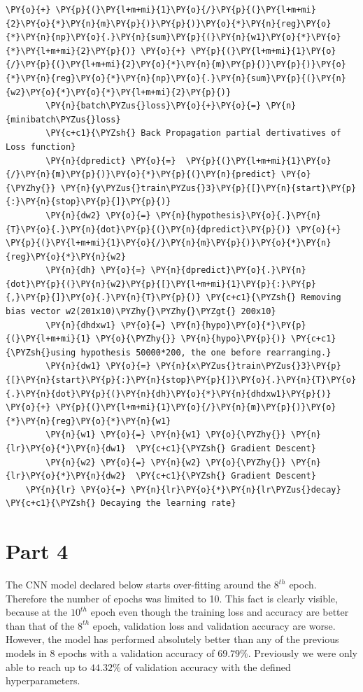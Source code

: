 \documentclass[a4paper,11pt]{article}%
\begin{document}
\begin{tcolorbox}[breakable, size=fbox, boxrule=1pt, pad at break*=1mm,colback=cellbackground, colframe=cellborder]
\begin{Verbatim}[commandchars=\\\{\}]
             \PY{o}{+} \PY{p}{(}\PY{l+m+mi}{1}\PY{o}{/}\PY{p}{(}\PY{l+m+mi}{2}\PY{o}{*}\PY{n}{m}\PY{p}{)}\PY{p}{)}\PY{o}{*}\PY{n}{reg}\PY{o}{*}\PY{n}{np}\PY{o}{.}\PY{n}{sum}\PY{p}{(}\PY{n}{w1}\PY{o}{*}\PY{o}{*}\PY{l+m+mi}{2}\PY{p}{)} \PY{o}{+} \PY{p}{(}\PY{l+m+mi}{1}\PY{o}{/}\PY{p}{(}\PY{l+m+mi}{2}\PY{o}{*}\PY{n}{m}\PY{p}{)}\PY{p}{)}\PY{o}{*}\PY{n}{reg}\PY{o}{*}\PY{n}{np}\PY{o}{.}\PY{n}{sum}\PY{p}{(}\PY{n}{w2}\PY{o}{*}\PY{o}{*}\PY{l+m+mi}{2}\PY{p}{)}
        \PY{n}{batch\PYZus{}loss}\PY{o}{+}\PY{o}{=} \PY{n}{minibatch\PYZus{}loss}
        \PY{c+c1}{\PYZsh{} Back Propagation partial dertivatives of Loss function}
        \PY{n}{dpredict} \PY{o}{=}  \PY{p}{(}\PY{l+m+mi}{1}\PY{o}{/}\PY{n}{m}\PY{p}{)}\PY{o}{*}\PY{p}{(}\PY{n}{predict} \PY{o}{\PYZhy{}} \PY{n}{y\PYZus{}train\PYZus{}3}\PY{p}{[}\PY{n}{start}\PY{p}{:}\PY{n}{stop}\PY{p}{]}\PY{p}{)}
        \PY{n}{dw2} \PY{o}{=} \PY{n}{hypothesis}\PY{o}{.}\PY{n}{T}\PY{o}{.}\PY{n}{dot}\PY{p}{(}\PY{n}{dpredict}\PY{p}{)} \PY{o}{+} \PY{p}{(}\PY{l+m+mi}{1}\PY{o}{/}\PY{n}{m}\PY{p}{)}\PY{o}{*}\PY{n}{reg}\PY{o}{*}\PY{n}{w2}
        \PY{n}{dh} \PY{o}{=} \PY{n}{dpredict}\PY{o}{.}\PY{n}{dot}\PY{p}{(}\PY{n}{w2}\PY{p}{[}\PY{l+m+mi}{1}\PY{p}{:}\PY{p}{,}\PY{p}{]}\PY{o}{.}\PY{n}{T}\PY{p}{)} \PY{c+c1}{\PYZsh{} Removing bias vector w2(201x10)\PYZhy{}\PYZhy{}\PYZgt{} 200x10}
        \PY{n}{dhdxw1} \PY{o}{=} \PY{n}{hypo}\PY{o}{*}\PY{p}{(}\PY{l+m+mi}{1} \PY{o}{\PYZhy{}} \PY{n}{hypo}\PY{p}{)} \PY{c+c1}{\PYZsh{}using hypothesis 50000*200, the one before rearranging.}
        \PY{n}{dw1} \PY{o}{=} \PY{n}{x\PYZus{}train\PYZus{}3}\PY{p}{[}\PY{n}{start}\PY{p}{:}\PY{n}{stop}\PY{p}{]}\PY{o}{.}\PY{n}{T}\PY{o}{.}\PY{n}{dot}\PY{p}{(}\PY{n}{dh}\PY{o}{*}\PY{n}{dhdxw1}\PY{p}{)} \PY{o}{+} \PY{p}{(}\PY{l+m+mi}{1}\PY{o}{/}\PY{n}{m}\PY{p}{)}\PY{o}{*}\PY{n}{reg}\PY{o}{*}\PY{n}{w1}
        \PY{n}{w1} \PY{o}{=} \PY{n}{w1} \PY{o}{\PYZhy{}} \PY{n}{lr}\PY{o}{*}\PY{n}{dw1}  \PY{c+c1}{\PYZsh{} Gradient Descent}
        \PY{n}{w2} \PY{o}{=} \PY{n}{w2} \PY{o}{\PYZhy{}} \PY{n}{lr}\PY{o}{*}\PY{n}{dw2}  \PY{c+c1}{\PYZsh{} Gradient Descent}
    \PY{n}{lr} \PY{o}{=} \PY{n}{lr}\PY{o}{*}\PY{n}{lr\PYZus{}decay}      \PY{c+c1}{\PYZsh{} Decaying the learning rate}
\end{Verbatim}
\end{tcolorbox}


\section*{Part 4}

The CNN model declared below starts over-fitting around the $8^{th}$ epoch. Therefore the number of epochs was limited to 10. This fact is clearly visible, because at the $10^{th}$ epoch even though the training loss and accuracy are better than that of the $8^{th}$ epoch, validation loss and validation accuracy are worse. However, the model has performed absolutely better than any of the previous models in 8 epochs with a validation accuracy of $69.79\%$. Previously we were only able to reach up to $44.32\%$ of validation accuracy with the defined hyperparameters.
\end{document}

